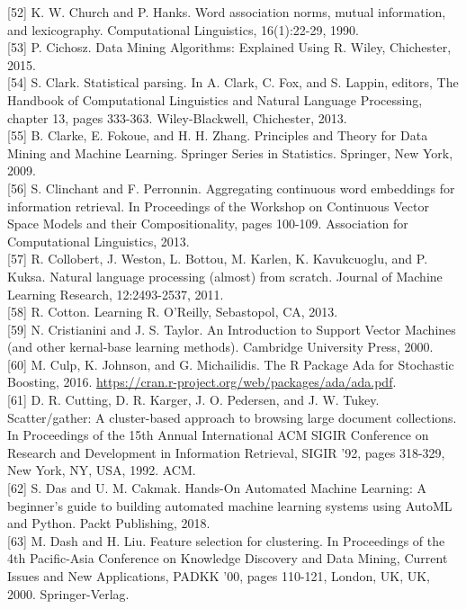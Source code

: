 \documentclass[10pt]{book}
\begin{document}
[52] K. W. Church and P. Hanks. Word association norms, mutual information, and lexicography. Computational Linguistics, 16(1):22-29, 1990.\\[0pt]
[53] P. Cichosz. Data Mining Algorithms: Explained Using R. Wiley, Chichester, 2015.\\[0pt]
[54] S. Clark. Statistical parsing. In A. Clark, C. Fox, and S. Lappin, editors, The Handbook of Computational Linguistics and Natural Language Processing, chapter 13, pages 333-363. Wiley-Blackwell, Chichester, 2013.\\[0pt]
[55] B. Clarke, E. Fokoue, and H. H. Zhang. Principles and Theory for Data Mining and Machine Learning. Springer Series in Statistics. Springer, New York, 2009.\\[0pt]
[56] S. Clinchant and F. Perronnin. Aggregating continuous word embeddings for information retrieval. In Proceedings of the Workshop on Continuous Vector Space Models and their Compositionality, pages 100-109. Association for Computational Linguistics, 2013.\\[0pt]
[57] R. Collobert, J. Weston, L. Bottou, M. Karlen, K. Kavukcuoglu, and P. Kuksa. Natural language processing (almost) from scratch. Journal of Machine Learning Research, 12:2493-2537, 2011.\\[0pt]
[58] R. Cotton. Learning R. O'Reilly, Sebastopol, CA, 2013.\\[0pt]
[59] N. Cristianini and J. S. Taylor. An Introduction to Support Vector Machines (and other kernal-base learning methods). Cambridge University Press, 2000.\\[0pt]
[60] M. Culp, K. Johnson, and G. Michailidis. The R Package Ada for Stochastic Boosting, 2016. \href{https://cran.r-project.org/web/packages/ada/ada.pdf}{https://cran.r-project.org/web/packages/ada/ada.pdf}.\\[0pt]
[61] D. R. Cutting, D. R. Karger, J. O. Pedersen, and J. W. Tukey. Scatter/gather: A cluster-based approach to browsing large document collections. In Proceedings of the 15th Annual International ACM SIGIR Conference on Research and Development in Information Retrieval, SIGIR '92, pages 318-329, New York, NY, USA, 1992. ACM.\\[0pt]
[62] S. Das and U. M. Cakmak. Hands-On Automated Machine Learning: A beginner's guide to building automated machine learning systems using AutoML and Python. Packt Publishing, 2018.\\[0pt]
[63] M. Dash and H. Liu. Feature selection for clustering. In Proceedings of the 4th Pacific-Asia Conference on Knowledge Discovery and Data Mining, Current Issues and New Applications, PADKK '00, pages 110-121, London, UK, UK, 2000. Springer-Verlag.\\[0pt]
\end{document}
